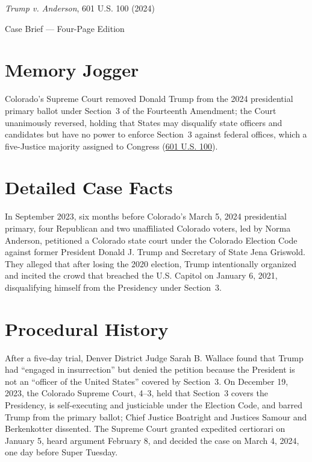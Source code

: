 \documentclass[12pt]{article}
\begin{document}
\begin{center}
{\LARGE \textit{Trump v. Anderson}, 601 U.S. 100 (2024)\par}
\vspace{0.8em}
{\large Case Brief --- Four-Page Edition\par}
\end{center}
\vspace{1em}

\section{Memory Jogger}

Colorado's Supreme Court removed Donald Trump from the 2024 presidential primary ballot under Section~3 of the Fourteenth Amendment; the Court unanimously reversed, holding that States may disqualify state officers and candidates but have no power to enforce Section~3 against federal offices, which a five-Justice majority assigned to Congress (\href{https://www.supremecourt.gov/opinions/23pdf/601us1r06_m6hn.pdf}{601 U.S. 100}).

\section{Detailed Case Facts}

In September 2023, six months before Colorado's March 5, 2024 presidential primary, four Republican and two unaffiliated Colorado voters, led by Norma Anderson, petitioned a Colorado state court under the Colorado Election Code against former President Donald J. Trump and Secretary of State Jena Griswold. They alleged that after losing the 2020 election, Trump intentionally organized and incited the crowd that breached the U.S. Capitol on January 6, 2021, disqualifying himself from the Presidency under Section~3.

\section{Procedural History}

After a five-day trial, Denver District Judge Sarah B. Wallace found that Trump had ``engaged in insurrection'' but denied the petition because the President is not an ``officer of the United States'' covered by Section~3. On December 19, 2023, the Colorado Supreme Court, 4--3, held that Section~3 covers the Presidency, is self-executing and justiciable under the Election Code, and barred Trump from the primary ballot; Chief Justice Boatright and Justices Samour and Berkenkotter dissented. The Supreme Court granted expedited certiorari on January 5, heard argument February 8, and decided the case on March 4, 2024, one day before Super Tuesday.
\end{document}
